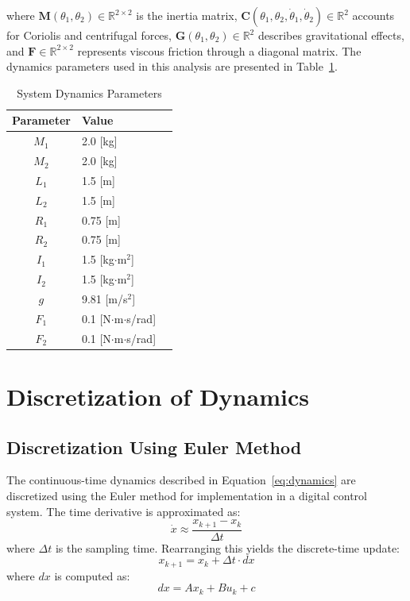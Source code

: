 where $\mathbf{M}(\theta_1, \theta_2) \in \mathbb{R}^{2\times2}$ is the inertia matrix, $\mathbf{C}(\theta_1, \theta_2, \dot{\theta}_1, \dot{\theta}_2) \in \mathbb{R}^2$ accounts for Coriolis and centrifugal forces, $\mathbf{G}(\theta_1, \theta_2) \in \mathbb{R}^2$ describes gravitational effects, and $\mathbf{F} \in \mathbb{R}^{2\times2}$ represents viscous friction through a diagonal matrix. The dynamics parameters used in this analysis are presented in Table~\ref{tab:parameters}.

\begin{table}[htbp]
\centering
\caption{System Dynamics Parameters}
\label{tab:parameters}
\begin{tabular}{clc}
\hline
Parameter & Value \\
\hline
$M_1$ & 2.0 [kg] \\
$M_2$ & 2.0 [kg] \\
$L_1$ & 1.5 [m] \\
$L_2$ & 1.5 [m] \\
$R_1$ & 0.75 [m] \\
$R_2$ & 0.75 [m] \\
$I_1$ & 1.5 [kg$\cdot$m$^2$] \\
$I_2$ & 1.5 [kg$\cdot$m$^2$] \\
$g$ & 9.81 [m/s$^2$] \\
$F_1$ & 0.1 [N$\cdot$m$\cdot$s/rad] \\
$F_2$ & 0.1 [N$\cdot$m$\cdot$s/rad] \\
\hline
\end{tabular}
\end{table}

\section{Discretization of Dynamics}

\subsection{Discretization Using Euler Method}

The continuous-time dynamics described in Equation~\ref{eq:dynamics} are discretized using the Euler method for implementation in a digital control system. The time derivative is approximated as:
\[
\dot{x} \approx \frac{x_{k+1} - x_k}{\Delta t}
\]
where \(\Delta t\) is the sampling time. Rearranging this yields the discrete-time update:
\[
x_{k+1} = x_k + \Delta t \cdot dx
\]
where \(dx\) is computed as:
\[
dx = A x_k + B u_k + c
\]

